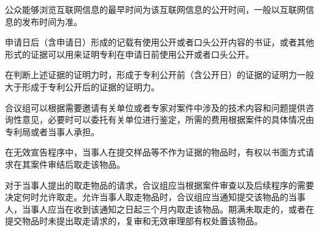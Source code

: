 公众能够浏览互联网信息的最早时间为该互联网信息的公开时间，一般以互联网信息的发布时间为准。

申请日后（含申请日）形成的记载有使用公开或者口头公开内容的书证，或者其他形式的证据可以用来证明专利在申请日前使用公开或者口头公开。

在判断上述证据的证明力时，形成于专利公开前（含公开日）的证据的证明力一般大于形成于专利公开后的证据的证明力。

合议组可以根据需要邀请有关单位或者专家对案件中涉及的技术内容和问题提供咨询性意见，必要时可以委托有关单位进行鉴定，所需的费用根据案件的具体情况由专利局或者当事人承担。

在无效宣告程序中，当事人在提交样品等不作为证据的物品时，有权以书面方式请求在其案件审结后取走该物品。

对于当事人提出的取走物品的请求，合议组应当根据案件审查以及后续程序的需要决定何时允许取走。允许当事人取走物品时，合议组应当通知提交该物品的当事人，当事人应当在收到该通知之日起三个月内取走该物品。期满未取走的，或者在提交物品时未提出取走请求的，复审和无效审理部有权处置该物品。

\stopparttoc
